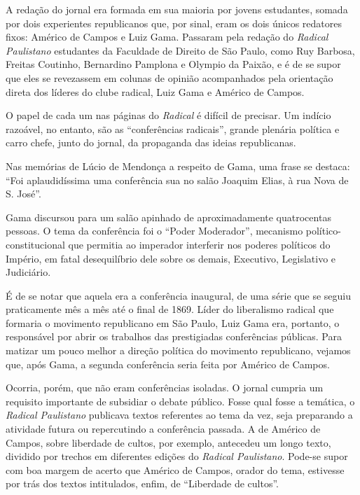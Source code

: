 A redação do jornal era formada em sua maioria por jovens estudantes,
somada por dois experientes republicanos que, por sinal, eram os dois
únicos redatores fixos: Américo de Campos e Luiz Gama. Passaram pela
redação do \emph{Radical Paulistano} estudantes da Faculdade de Direito
de São Paulo, como Ruy Barbosa, Freitas Coutinho, Bernardino Pamplona e
Olympio da Paixão, e é de se supor que eles se revezassem em colunas de
opinião acompanhados pela orientação direta dos líderes do clube
radical, Luiz Gama e Américo de Campos.

O papel de cada um nas páginas do \emph{Radical} é difícil de precisar.
Um indício razoável, no entanto, são as ``conferências radicais'', grande
plenária política e carro chefe, junto do jornal, da propaganda das
ideias republicanas.

Nas memórias de Lúcio de Mendonça a respeito de Gama, uma frase se
destaca: ``Foi aplaudidíssima uma conferência sua no salão Joaquim Elias,
à rua Nova de S. José''.

Gama discursou para um salão apinhado de aproximadamente quatrocentas
pessoas. O tema da conferência foi o ``Poder Moderador'', mecanismo
político-constitucional que permitia ao imperador interferir nos poderes
políticos do Império, em fatal desequilíbrio dele sobre os demais,
Executivo, Legislativo e Judiciário.

É de se notar que aquela era a conferência inaugural, de uma série que
se seguiu praticamente mês a mês até o final de 1869. Líder do
liberalismo radical que formaria o movimento republicano em São Paulo,
Luiz Gama era, portanto, o responsável por abrir os trabalhos das
prestigiadas conferências públicas. Para matizar um pouco melhor a
direção política do movimento republicano, vejamos que, após Gama, a
segunda conferência seria feita por Américo de Campos.

Ocorria, porém, que não eram conferências isoladas. O jornal cumpria um
requisito importante de subsidiar o debate público. Fosse qual fosse a
temática, o \emph{Radical Paulistano} publicava textos referentes ao
tema da vez, seja preparando a atividade futura ou repercutindo a
conferência passada. A de Américo de Campos, sobre liberdade
de cultos, por exemplo, antecedeu um longo texto, dividido por trechos
em diferentes edições do \emph{Radical Paulistano}. Pode-se supor com
boa margem de acerto que Américo de Campos, orador do tema, estivesse
por trás dos textos intitulados, enfim, de ``Liberdade de cultos''.

